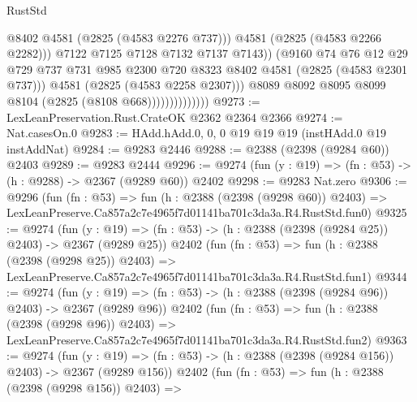 \begin{lexlean}{RustStd}
\begin{coremodule}
                                      @8402
                                      @4581
                                      (@2825 (@4583 @2276 @737)))
                                    @4581
                                    (@2825 (@4583 @2266 @2282)))
                                  @7122
                                  @7125
                                  @7128
                                  @7132
                                  @7137
                                  @7143))
                              (@9160
                                @74
                                @76
                                @12
                                @29
                                @729
                                @737
                                @731
                                @985
                                @2300
                                @720
                                @8323
                                @8402
                                @4581
                                (@2825 (@4583 @2301 @737)))
                              @4581
                              (@2825 (@4583 @2258 @2307)))
                            @8089
                            @8092
                            @8095
                            @8099
                            @8104
                            (@2825 (@8108 @668))))))))))))))
@9273 := LexLeanPreservation.Rust.CrateOK @2362 @2364 @2366
@9274 := Nat.casesOn.{0}
@9283 := HAdd.hAdd.{0, 0, 0} @19 @19 @19 (instHAdd.{0} @19 instAddNat)
@9284 := @9283 @2446
@9288 := @2388 (@2398 (@9284 @60)) @2403
@9289 := @9283 @2444
@9296 := @9274 (fun (y : @19) => (fn : @53) -> (h : @9288) -> @2367 (@9289 @60)) @2402
@9298 := @9283 Nat.zero
@9306 := @9296
    (fun (fn : @53) =>
    fun (h : @2388 (@2398 (@9298 @60)) @2403) =>
    LexLeanPreserve.Ca857a2c7e4965f7d01141ba701c3da3a.R4.RustStd.fun0)
@9325 := @9274
    (fun (y : @19) => (fn : @53) -> (h : @2388 (@2398 (@9284 @25)) @2403) -> @2367 (@9289 @25))
    @2402
    (fun (fn : @53) =>
    fun (h : @2388 (@2398 (@9298 @25)) @2403) =>
    LexLeanPreserve.Ca857a2c7e4965f7d01141ba701c3da3a.R4.RustStd.fun1)
@9344 := @9274
    (fun (y : @19) => (fn : @53) -> (h : @2388 (@2398 (@9284 @96)) @2403) -> @2367 (@9289 @96))
    @2402
    (fun (fn : @53) =>
    fun (h : @2388 (@2398 (@9298 @96)) @2403) =>
    LexLeanPreserve.Ca857a2c7e4965f7d01141ba701c3da3a.R4.RustStd.fun2)
@9363 := @9274
    (fun (y : @19) => (fn : @53) -> (h : @2388 (@2398 (@9284 @156)) @2403) -> @2367 (@9289 @156))
    @2402
    (fun (fn : @53) =>
    fun (h : @2388 (@2398 (@9298 @156)) @2403) =>

\end{coremodule}
\end{lexlean}
